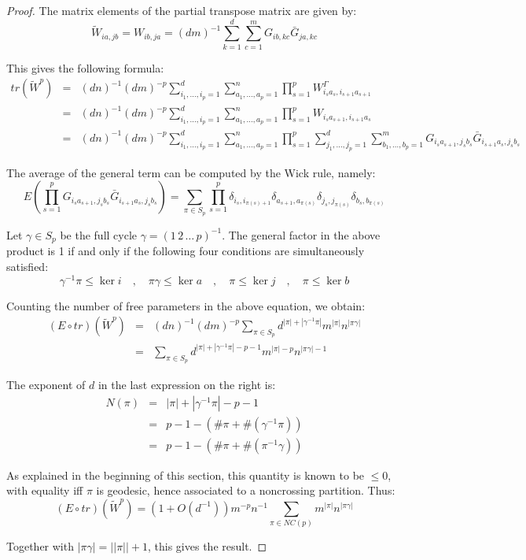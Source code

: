 \documentclass[12pt]{amsbook}
\begin{document}
\begin{proof}
The matrix elements of the partial transpose matrix are given by:
$$\tilde{W}_{ia,jb}=W_{ib,ja}=(dm)^{-1}\sum_{k=1}^d\sum_{c=1}^mG_{ib,kc}\bar{G}_{ja,kc}$$

This gives the following formula:
\begin{eqnarray*}
tr(\tilde{W}^p)
&=&(dn)^{-1}(dm)^{-p}\sum_{i_1,\ldots,i_p=1}^d\sum_{a_1,\ldots,a_p=1}^n\prod_{s=1}^p{W}^{\Gamma}_{i_sa_s,i_{s+1}a_{s+1}}\\
&=&(dn)^{-1}(dm)^{-p}\sum_{i_1,\ldots,i_p=1}^d\sum_{a_1,\ldots,a_p=1}^n\prod_{s=1}^p W_{i_sa_{s+1},i_{s+1}a_s} \\
&=&(dn)^{-1}(dm)^{-p}\sum_{i_1,\ldots,i_p=1}^d\sum_{a_1,\ldots,a_p=1}^n\prod_{s=1}^p \sum_{j_1,\ldots,j_p=1}^d\sum_{b_1,\ldots,b_p=1}^mG_{i_sa_{s+1},j_sb_s}\bar{G}_{i_{s+1}a_s,j_sb_s}
\end{eqnarray*}

The average of the general term can be computed by the Wick rule, namely:
$$E\left(\prod_{s=1}^pG_{i_sa_{s+1},j_sb_s}\bar{G}_{i_{s+1}a_s,j_sb_s}\right)
=\sum_{\pi\in S_p}\prod_{s=1}^p\delta_{i_s,i_{\pi(s)+1}}\delta_{a_{s+1},a_{\pi(s)}}\delta_{j_s,j_{\pi(s)}}\delta_{b_s,b_{\pi(s)}}$$

Let $\gamma\in S_p$ be the full cycle $\gamma=(1 \, 2 \, \ldots \, p)^{-1}$. The general factor in the above product is 1 if and only if the following four conditions are simultaneously satisfied:
$$\gamma^{-1}\pi\leq \ker i\quad,\quad
\pi\gamma \leq \ker a\quad,\quad
\pi \leq \ker j\quad,\quad
\pi \leq \ker b$$

Counting the number of free parameters in the above equation, we obtain:
\begin{eqnarray*}
(E\circ tr)(\tilde{W}^p)
&=&(dn)^{-1}(dm)^{-p}\sum_{\pi\in S_p}d^{|\pi|+|\gamma^{-1}\pi|}m^{|\pi|}n^{|\pi\gamma|}\\
&=&\sum_{\pi\in S_p}d^{|\pi|+|\gamma^{-1}\pi|-p-1}m^{|\pi|-p}n^{|\pi\gamma|-1}
\end{eqnarray*}

The exponent of $d$ in the last expression on the right is:
\begin{eqnarray*}
N(\pi)
&=&|\pi|+|\gamma^{-1}\pi|-p-1\\
&=&p-1-(\#\pi+\#(\gamma^{-1}\pi))\\
&=&p-1-(\#\pi+\#(\pi^{-1}\gamma))
\end{eqnarray*}

As explained in the beginning of this section, this quantity is known to be $\leq 0$, with equality iff $\pi$ is geodesic, hence associated to a noncrossing partition. Thus:
$$(E\circ tr)(\tilde{W}^p)=(1+O(d^{-1}))m^{-p}n^{-1}\sum_{\pi\in NC(p)}m^{|\pi|} n^{|\pi\gamma|}$$

Together with $|\pi\gamma|=||\pi||+1$, this gives the result.
\end{proof}
\end{document}
